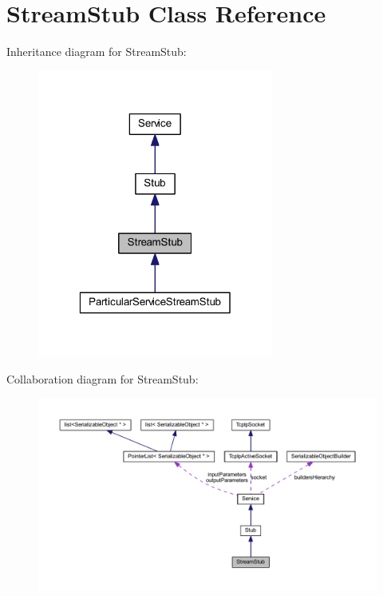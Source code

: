 \hypertarget{class_stream_stub}{
\section{StreamStub Class Reference}
\label{class_stream_stub}
}


Inheritance diagram for StreamStub:\nopagebreak
\begin{figure}[H]
\begin{center}
\leavevmode
\includegraphics[width=220pt]{class_stream_stub__inherit__graph}
\end{center}
\end{figure}


Collaboration diagram for StreamStub:\nopagebreak
\begin{figure}[H]
\begin{center}
\leavevmode
\includegraphics[width=400pt]{class_stream_stub__coll__graph}
\end{center}
\end{figure}
